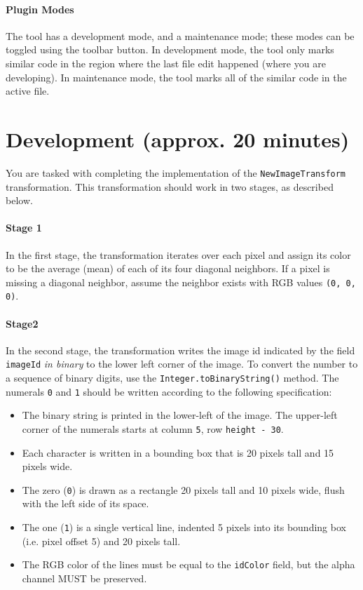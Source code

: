 \documentclass[12pt]{article}
\begin{document}
\paragraph{Plugin Modes}
The tool has a development mode, and a maintenance mode; these modes
can be toggled using the toolbar button. In development mode, the tool only
marks similar code in the region where the last file edit happened
(where you are developing). In maintenance mode, the tool marks all of
the similar code in the active file.

\pagebreak

\section{Development (approx. 20 minutes)}

You are tasked with completing the implementation of the
\verb|NewImageTransform| transformation.  This transformation should
work in two stages, as described below.

\paragraph{Stage 1}
In the first stage, the transformation iterates over each
pixel and assign its color to be the average (mean) of each of its
four diagonal neighbors. If a pixel is missing a diagonal neighbor,
assume the neighbor exists with RGB values \verb|(0, 0, 0)|.

\paragraph{Stage2}
In the second stage, the transformation
writes the image id indicated by the field \verb|imageId| \textit{in binary} to the lower
left corner of the image.  To convert the number to a sequence of binary digits, use the 
\verb|Integer.toBinaryString()| method. The numerals \verb|0|
and \verb|1| should be written according to the following specification:

\begin{itemize}
\item The binary string is printed in the lower-left of the image. 
The upper-left corner of the numerals starts at column \verb|5|, row \verb|height - 30|.
\item Each character is written in a bounding box that is 20 pixels tall and 15 pixels wide.
\item The zero (\verb|0|) is drawn as a rectangle 20 pixels tall and 10 pixels wide, flush
  with the left side of its space.
\item The one (\verb|1|) is a single vertical line, indented 5 pixels into its
  bounding box (i.e. pixel offset 5) and 20 pixels tall.
\item The RGB color of the lines must be equal to the \verb|idColor|
  field, but the alpha channel MUST be preserved.
\end{itemize}
\end{document}
